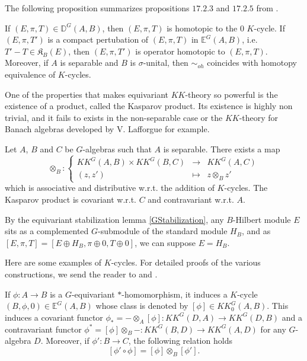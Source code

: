The following proposition summarizes propositions $17.2.3$ and $17.2.5$ from \cite{blackadar}. 
 
\begin{prop} If $(E,\pi,T)\in\mathbb D^G(A,B)$, then $(E,\pi,T)$ is homotopic to the $0$ $K$-cycle.
If $(E,\pi,T')$ is a compact pertubation of $(E,\pi,T)$ in $\mathbb E^G(A,B)$, i.e. $T'-T\in \mathfrak K_B(E)$, then $(E,\pi,T')$ is operator homotopic to $(E,\pi,T)$.\\
Moreover, if $A$ is separable and $B$ is $\sigma$-unital, then $\sim_{oh}$ coincides with homotopy equivalence of $K$-cycles.
\end{prop}

One of the properties that makes equivariant $KK$-theory so powerful is the existence of a product, called the Kasparov product. Its existence is highly non trivial, and it fails to exists in the non-separable case or the $KK$-theory for Banach algebras developed by V. Lafforgue \cite{Lafforgue} for example.

\begin{prop}\cite{LeGall} Let $A$, $B$ and $C$ be $G$-algebras such that $A$ is separable. There exists a map 
\[\otimes_B :\left\{\begin{array}{ccc} KK^G(A,B)\times KK^G(B,C) & \rightarrow & KK^G(A,C) \\ (z,z') & \mapsto & z\otimes_B z' \end{array}\right. \]
which is associative and distributive w.r.t. the addition of $K$-cycles. The Kasparov product is covariant w.r.t. $C$ and contravariant w.r.t. $A$.
\end{prop}

\begin{rk}
By the equivariant stabilization lemma \ref{GStabilization}, any $B$-Hilbert module $E$ sits as a complemented $G$-submodule of the standard module $H_B$, and as $[E,\pi,T] = [E \oplus H_B,\pi\oplus 0,T\oplus 0]$, we can suppose $E = H_B$.
\end{rk}

Here are some examples of $K$-cycles. For detailed proofs of the various constructions, we send the reader to \cite{blackadar} and \cite{LeGall}.

\begin{Expl}
If $\phi : A\rightarrow B$ is a $G$-equivariant $*$-homomorphism, it induces a $K$-cycle $(B,\phi,0)\in \mathbb E^G(A,B)$ whose class is denoted by $[\phi]\in KK_0^G(A,B)$. This induces a covariant functor $\phi_* = - \otimes_A [\phi] : KK^G(D,A)\rightarrow KK^G(D,B)$ and a contravariant functor $\phi^*=  [\phi] \otimes_B - : KK^G(B,D)\rightarrow KK^G(A,D)$ for any $G$-algebra $D$. Moreover, if $\phi' : B\rightarrow C$, the following relation holds 
\[ [\phi'\circ \phi] = [\phi]\otimes_B [\phi'].\]
\end{Expl}

